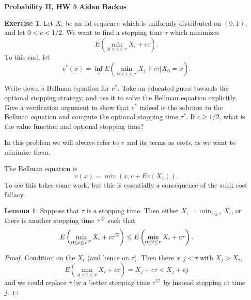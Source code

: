 \documentclass[10pt]{article}
\newcommand{\heart}{\ensuremath\heartsuit}
\theoremstyle{definition}
\newtheorem{exer}{Exercise}
\newtheorem{lemma}{Lemma}[exer]
\begin{document}
\noindent
\large\textbf{Probability II, HW 5} \hfill \textbf{Aidan Backus} \\

\begin{exer}
Let $X_i$ be an iid sequence which is uniformly distributed on $(0, 1)$, and let $0 < c < 1/2$.
We want to find a stopping time $\tau$ which minimizes
$$E\left(\min_{0 \leq i \leq \tau} X_i + c\tau\right).$$
To this end, let
\begin{equation}
\label{Optimization1}
v^*(x) = \inf_\tau E\left(\min_{0 \leq i \leq \tau} X_i + c\tau\bigg|X_0 = x\right).
\end{equation}

Write down a Bellman equation for $v^*$.
Take an educated guess towards the optional stopping strategy, and use it to solve the Bellman equation explicitly.
Give a verification argument to show that $v^*$ indeed is the solution to the Bellman equation and compute the optional stopping time $\tau^*$.
If $c \geq 1/2$, what is the value function and optional stopping time?
\end{exer}

In this problem we will always refer to $v$ and its terms as \emph{costs}, as we want to minimize them.

The Bellman equation is
\begin{equation}
\label{Bellman1}
v(x) = \min(x, c + Ev(X_1)).
\end{equation}
To see this takes some work, but this is essentially a consequence of the sunk cost fallacy.

\begin{lemma}
\label{lemma11}
Suppose that $\tau$ is a stopping time.
Then either $X_\tau = \min_{i \leq \tau} X_i$, or there is another stopping time $\tau^\heart$ such that
$$E\left(\min_{0 \leq i \leq \tau^\heart} X_i + c\tau^\heart\right) \leq E\left(\min_{0 \leq i \leq \tau} X_i + c\tau\right).$$
\end{lemma}
\begin{proof}
Condition on the $X_i$ (and hence on $\tau$). Then there is $j < \tau$ with $X_j > X_\tau$,
$$E\left(\min_{0 \leq i \leq \tau} X_i + c\tau\right) = X_j + c\tau < X_j + cj$$
and we could replace $\tau$ by a better stopping time $\tau^\heart$ by instead stopping at time $j$.
\end{proof}
\end{document}
